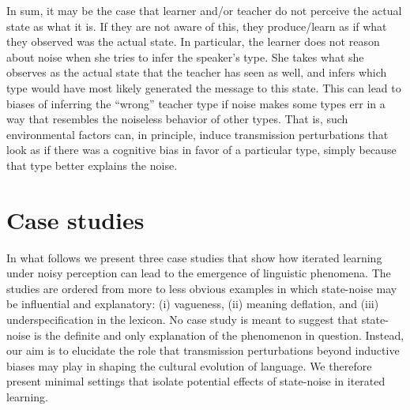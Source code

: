 \documentclass[10pt,a4paper]{article}
\newcommand{\citeposs}[2][]{\citeauthor{#2}'s (\citeyear[#1]{#2})}
\begin{document}
In sum, it may be the case that learner and/or teacher do not perceive the actual state as what
it is. If they are not aware of this, they produce/learn as if what they observed was the
actual state. In particular, the learner does not reason about noise when she tries to infer
the speaker's type. She takes what she observes as the actual state that the teacher has seen
as well, and infers which type would have most likely generated the message to this state. This
can lead to biases of inferring the ``wrong'' teacher type if noise makes some types err in a
way that resembles the noiseless behavior of other types. That is, such environmental factors
can, in principle, induce transmission perturbations that look as if there was a cognitive bias
in favor of a particular type, simply because that type better explains the noise.


\section{Case studies}

In what follows we present three case studies that show how iterated learning under noisy
perception can lead to the emergence of linguistic phenomena. The 
studies are ordered from more to less obvious examples in which state-noise may be influential
and explanatory: (i) vagueness, (ii) meaning deflation, and (iii) underspecification in the
lexicon.
No case study is meant to suggest that state-noise is the definite and only explanation of the
phenomenon in question. Instead, our aim is to elucidate the role that transmission perturbations beyond
inductive biases may play in shaping the cultural evolution of language. We therefore present
minimal settings that isolate potential effects of state-noise in iterated learning.
\end{document}
